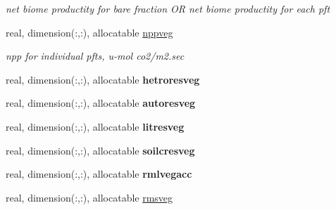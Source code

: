 \begin{DoxyCompactItemize}
\begin{DoxyCompactList}\small\item\em net biome productity for bare fraction O\+R net biome productity for each pft \end{DoxyCompactList}\item 
\hypertarget{structctem__statevars_1_1veg__gat_a5e36a186d9a6518e2caac836c949c246}{}real, dimension(\+:,\+:), allocatable \hyperlink{structctem__statevars_1_1veg__gat_a5e36a186d9a6518e2caac836c949c246}{nppveg}\label{structctem__statevars_1_1veg__gat_a5e36a186d9a6518e2caac836c949c246}

\begin{DoxyCompactList}\small\item\em npp for individual pfts, u-\/mol co2/m2.\+sec \end{DoxyCompactList}\item 
\hypertarget{structctem__statevars_1_1veg__gat_a6539c2924d8fc188fea124ce949e3f32}{}real, dimension(\+:,\+:), allocatable {\bfseries hetroresveg}\label{structctem__statevars_1_1veg__gat_a6539c2924d8fc188fea124ce949e3f32}

\item 
\hypertarget{structctem__statevars_1_1veg__gat_a2b10d1555288a3d7cc024b625f4262d4}{}real, dimension(\+:,\+:), allocatable {\bfseries autoresveg}\label{structctem__statevars_1_1veg__gat_a2b10d1555288a3d7cc024b625f4262d4}

\item 
\hypertarget{structctem__statevars_1_1veg__gat_a20602c33f92d3751a3f06a58f1c92eb9}{}real, dimension(\+:,\+:), allocatable {\bfseries litresveg}\label{structctem__statevars_1_1veg__gat_a20602c33f92d3751a3f06a58f1c92eb9}

\item 
\hypertarget{structctem__statevars_1_1veg__gat_a5bc027b05df8e7ebc6377adea267561a}{}real, dimension(\+:,\+:), allocatable {\bfseries soilcresveg}\label{structctem__statevars_1_1veg__gat_a5bc027b05df8e7ebc6377adea267561a}

\item 
\hypertarget{structctem__statevars_1_1veg__gat_aea3869abe2b921f0765d6d7746359403}{}real, dimension(\+:,\+:), allocatable {\bfseries rmlvegacc}\label{structctem__statevars_1_1veg__gat_aea3869abe2b921f0765d6d7746359403}

\item 
\hypertarget{structctem__statevars_1_1veg__gat_adf01fdc6c6306971f82f31e00f03f655}{}real, dimension(\+:,\+:), allocatable \hyperlink{structctem__statevars_1_1veg__gat_adf01fdc6c6306971f82f31e00f03f655}{rmsveg}\label{structctem__statevars_1_1veg__gat_adf01fdc6c6306971f82f31e00f03f655}


\end{DoxyCompactItemize}
